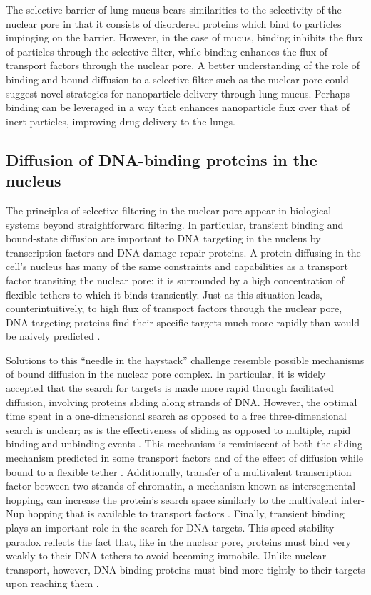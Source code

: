 The selective barrier of lung mucus bears similarities to the selectivity of the nuclear pore in that it consists of disordered proteins which bind to particles impinging on the barrier.  However, in the case of mucus, binding inhibits the flux of particles through the selective filter, while binding enhances the flux of transport factors through the nuclear pore.  A better understanding of the role of binding and bound diffusion to a selective filter such as the nuclear pore could suggest novel strategies for nanoparticle delivery through lung mucus.  Perhaps binding can be leveraged in a way that enhances nanoparticle flux over that of inert particles, improving drug delivery to the lungs.

\subsection{Diffusion of DNA-binding proteins in the nucleus}

The principles of selective filtering in the nuclear pore appear in biological systems beyond straightforward filtering.  In particular, transient binding and bound-state diffusion are important to DNA targeting in the nucleus by transcription factors and DNA damage repair proteins.  A protein diffusing in the cell's nucleus has many of the same constraints and capabilities as a transport factor transiting the nuclear pore: it is surrounded by a high concentration of flexible tethers to which it binds transiently.  Just as this situation leads, counterintuitively, to high flux of transport factors through the nuclear pore, DNA-targeting proteins find their specific targets much more rapidly than would be naively predicted \cite{mirny09}.  

Solutions to this ``needle in the haystack'' challenge resemble possible mechanisms of bound diffusion in the nuclear pore complex.  In particular, it is widely accepted that the search for targets is made more rapid through facilitated diffusion, involving proteins sliding along strands of DNA.  However, the optimal time spent in a one-dimensional search as opposed to a free three-dimensional search is unclear; as is the effectiveness of sliding as opposed to multiple, rapid binding and unbinding events \cite{halford09}.  This mechanism is reminiscent of both the sliding mechanism predicted in some transport factors and of the effect of diffusion while bound to a flexible tether \cite{raveh16}.  Additionally, transfer of a multivalent transcription factor between two strands of chromatin, a mechanism known as intersegmental hopping, can increase the protein's search space similarly to the multivalent inter-Nup hopping that is available to transport factors \cite{doucleff08,halford04a}.  Finally, transient binding plays an important role in the search for DNA targets.  This speed-stability paradox reflects the fact that, like in the nuclear pore, proteins must bind very weakly to their DNA tethers to avoid becoming immobile.  Unlike nuclear transport, however, DNA-binding proteins must bind more tightly to their targets upon reaching them \cite{iwahara13,zandarashvili15}.

